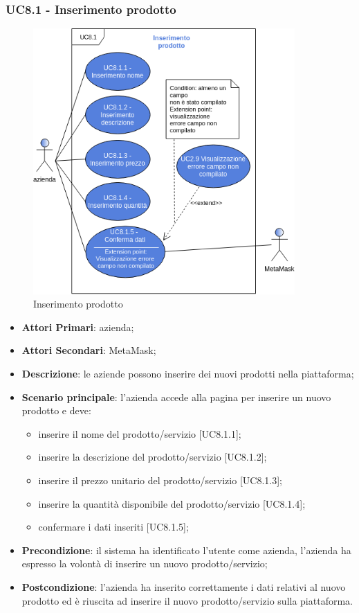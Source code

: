 \subsubsection{UC8.1 - Inserimento prodotto}
\begin{figure}[H]
	\includegraphics[width=10cm]{res/images/UC8-Inserimento.png}
	\centering
	\caption{Inserimento prodotto}
\end{figure}
\begin{itemize}
	\item \textbf{Attori Primari}: azienda;
	\item \textbf{Attori Secondari}: MetaMask\glo;
	\item \textbf{Descrizione}: le aziende possono inserire dei nuovi prodotti nella piattaforma;
	\item \textbf{Scenario principale}: l'azienda accede alla pagina per inserire un nuovo prodotto e deve:
	\begin{itemize}
		\item inserire il nome del prodotto/servizio [UC8.1.1];
		\item inserire la descrizione del prodotto/servizio [UC8.1.2];
		\item inserire il prezzo unitario del prodotto/servizio [UC8.1.3];
		\item inserire la quantità disponibile del prodotto/servizio [UC8.1.4];
		\item confermare i dati inseriti [UC8.1.5];
	\end{itemize}
	\item \textbf{Precondizione}: il sistema ha identificato l'utente come azienda, l'azienda ha espresso la volontà di inserire un nuovo prodotto/servizio;
	\item \textbf{Postcondizione}: l'azienda ha inserito correttamente i dati relativi al nuovo prodotto ed è riuscita ad inserire il nuovo prodotto/servizio sulla piattaforma.	
\end{itemize}
